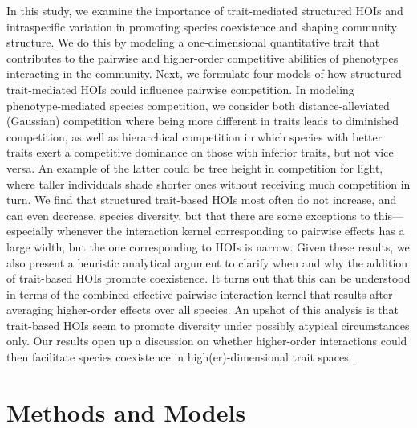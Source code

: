 \documentclass[11pt]{article}
\begin{document}
 In this study, we examine the importance of trait-mediated structured HOIs and intraspecific variation in promoting species coexistence and shaping community structure. We do this by modeling a one-dimensional quantitative trait that contributes to the pairwise and higher-order competitive abilities of phenotypes interacting in the community. Next, we formulate four models of how structured trait-mediated HOIs could influence pairwise competition. In modeling phenotype-mediated species competition, we consider both distance-alleviated (Gaussian) competition where being more different in traits leads to diminished competition, as well as hierarchical competition in which species with better traits exert a competitive dominance on those with inferior traits, but not vice versa. An example of the latter could be tree height in competition for light, where taller individuals shade shorter ones without receiving much competition in turn. We find that structured trait-based HOIs most often do not increase, and can even decrease, species diversity, but that there are some exceptions to this---especially whenever the interaction kernel corresponding to pairwise effects has a large width, but the one corresponding to HOIs is narrow. Given these results, we also present a heuristic analytical argument to clarify when and why the addition of trait-based HOIs promote coexistence. It turns out that this can be understood in terms of the combined effective pairwise interaction kernel that results after averaging higher-order effects over all species. An upshot of this analysis is that trait-based HOIs seem to promote diversity under possibly atypical circumstances only. Our results open up a discussion on whether higher-order interactions could then facilitate species coexistence in high(er)-dimensional trait spaces \citep{grilli_higher-order_2017,fox_existence_2023, singh_higher_2021, kleinhesselink_mechanisms_2019,gibbs_when_2024}. 


\section{Methods and Models} \label{sec:methods}
\end{document}

